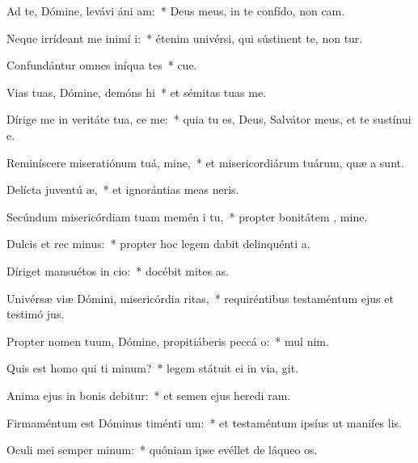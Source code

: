 \item Ad te, Dómine, levávi áni am:~* Deus meus, in te confído, non cam.
\item Neque irrídeant me inimí i:~* étenim univérsi, qui sústinent te, non tur.
\item Confundántur omnes iníqua tes~* cue.
\item Vias tuas, Dómine, demóns hi~* et sémitas tuas  me.
\item Dírige me in veritáte tua,  ce me:~* quia tu es, Deus, Salvátor meus, et te sustínui  e.
\item Reminíscere miseratiónum tuá, mine,~* et misericordiárum tuárum, quæ a  sunt.
\item Delícta juventú æ,~* et ignorántias meas  neris.
\item Secúndum misericórdiam tuam memén i tu,~* propter bonitátem , mine.
\item Dulcis et rec minus:~* propter hoc legem dabit delinquénti  a.
\item Díriget mansuétos in cio:~* docébit mites  as.
\item Univérsæ viæ Dómini, misericórdia  ritas,~* requiréntibus testaméntum ejus et testimó jus.
\item Propter nomen tuum, Dómine, propitiáberis peccá o:~* mul  nim.
\item Quis est homo qui ti minum?~* legem státuit ei in via,  git.
\item Anima ejus in bonis debitur:~* et semen ejus heredi ram.
\item Firmaméntum est Dóminus timénti um:~* et testaméntum ipsíus ut manifes lis.
\item Oculi mei semper  minum:~* quóniam ipse evéllet de láqueo  os.
